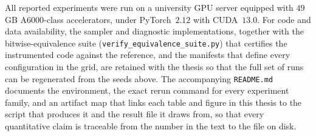 All reported experiments were run on a university GPU server equipped with $49$\,GB A6000-class accelerators, under PyTorch~$2.12$ with CUDA~$13.0$. For code and data availability, the sampler and diagnostic implementations, together with the bitwise-equivalence suite (\texttt{verify\_equivalence\_suite.py}) that certifies the instrumented code against the reference, and the manifests that define every configuration in the grid, are retained with the thesis so that the full set of runs can be regenerated from the seeds above. The accompanying \texttt{README.md} documents the environment, the exact rerun command for every experiment family, and an artifact map that links each table and figure in this thesis to the script that produces it and the result file it draws from, so that every quantitative claim is traceable from the number in the text to the file on disk.

